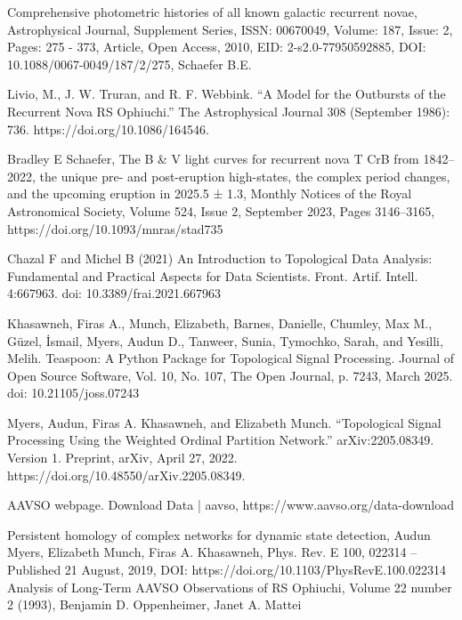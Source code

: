 \documentclass{article}
\begin{document}
\begin{thebibliography}{}

     Comprehensive photometric histories of all known galactic recurrent novae, Astrophysical Journal, Supplement Series, ISSN: 00670049, Volume: 187, Issue: 2, Pages: 275 - 373, Article, Open Access, 2010, EID: 2-s2.0-77950592885, DOI: 10.1088/0067-0049/187/2/275, Schaefer B.E.
    
     Livio, M., J. W. Truran, and R. F. Webbink. “A Model for the Outbursts of the Recurrent Nova RS Ophiuchi.” The Astrophysical Journal 308 (September 1986): 736. https://doi.org/10.1086/164546.

    
    Bradley E Schaefer, The B \& V light curves for recurrent nova T CrB from 1842–2022, the unique pre- and post-eruption high-states, the complex period changes, and the upcoming eruption in 2025.5 ± 1.3, Monthly Notices of the Royal Astronomical Society, Volume 524, Issue 2, September 2023, Pages 3146–3165, https://doi.org/10.1093/mnras/stad735
    
   Chazal F and Michel B (2021) An Introduction to Topological Data Analysis: Fundamental and Practical Aspects for Data Scientists. Front. Artif. Intell. 4:667963. doi: 10.3389/frai.2021.667963
   
    Khasawneh, Firas A., Munch, Elizabeth, Barnes, Danielle, Chumley, Max M., Güzel, İsmail, Myers, Audun D., Tanweer, Sunia, Tymochko, Sarah, and Yesilli, Melih. Teaspoon: A Python Package for Topological Signal Processing. Journal of Open Source Software, Vol. 10, No. 107, The Open Journal, p. 7243, March 2025. doi: 10.21105/joss.07243
   
   Myers, Audun, Firas A. Khasawneh, and Elizabeth Munch. “Topological Signal Processing Using the Weighted Ordinal Partition Network.” arXiv:2205.08349. Version 1. Preprint, arXiv, April 27, 2022. https://doi.org/10.48550/arXiv.2205.08349.

   AAVSO webpage. Download Data | aavso, https://www.aavso.org/data-download
   
    Persistent homology of complex networks for dynamic state detection, Audun Myers, Elizabeth Munch, Firas A. Khasawneh, Phys. Rev. E 100, 022314 – Published 21 August, 2019, DOI: https://doi.org/10.1103/PhysRevE.100.022314
    Analysis of Long-Term AAVSO Observations of RS Ophiuchi, Volume 22 number 2 (1993), Benjamin D. Oppenheimer, Janet A. Mattei


\end{thebibliography}
\end{document}
